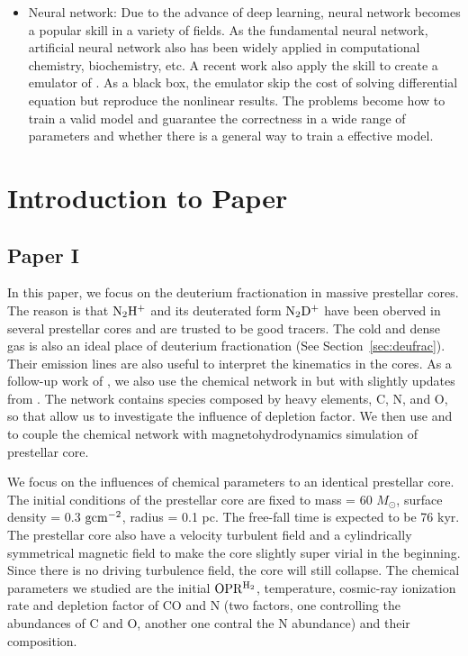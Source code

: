\begin{itemize}
    \item Neural network: Due to the advance of deep learning, neural network becomes a popular skill in a variety of fields. As the fundamental neural network, artificial neural network also has been widely applied in computational chemistry, biochemistry, etc\cite{Goncalves2013}. A recent work also apply the skill to create a emulator of {\UCLCHEM}\cite{DeMijolla2019}. As a black box, the emulator skip the cost of solving differential equation but reproduce the nonlinear results. The problems become how to train a valid model and guarantee the correctness in a wide range of parameters and whether there is a general way to train a effective model.
\end{itemize}


%
\chapter{Introduction to Paper}

\section{Paper I}
In this paper, we focus on the deuterium fractionation in massive prestellar cores. The reason is that $\rm N_2H^+$ and its deuterated form $\rm N_2D^+$ have been oberved in several prestellar cores and are trusted to be good tracers\cite{Caselli2002, Tan2013, Kong2016}. The cold and dense gas is also an ideal place of deuterium fractionation (See Section~\ref{sec:deufrac}). Their emission lines are also useful to interpret the kinematics in the cores. As a follow-up work of \cite{Goodson2016}, we also use the chemical network in \cite{Kong2015a} but with slightly updates from \cite{Majumdar2016a}. The network contains species composed by heavy elements, C, N, and O, so that allow us to investigate the influence of depletion factor. We then use {\ENZO} and {\KROME} to couple the chemical network with magnetohydrodynamics simulation of prestellar core.

We focus on the influences of chemical parameters to an identical prestellar core. The initial conditions of the prestellar core are fixed to mass = 60 $M_{\odot}$, surface density = 0.3 $\rm gcm^{-2}$, radius = 0.1 pc. The free-fall time is expected to be 76 kyr. The prestellar core also have a velocity turbulent field and a  cylindrically symmetrical magnetic field to make the core slightly super virial in the beginning. Since there is no driving turbulence field, the core will still collapse. The chemical parameters we studied are the initial $\rm OPR^{H_2}$, temperature, cosmic-ray ionization rate and depletion factor of CO and N (two factors, one controlling the abundances of C and O, another one contral the N abundance) and their composition.

